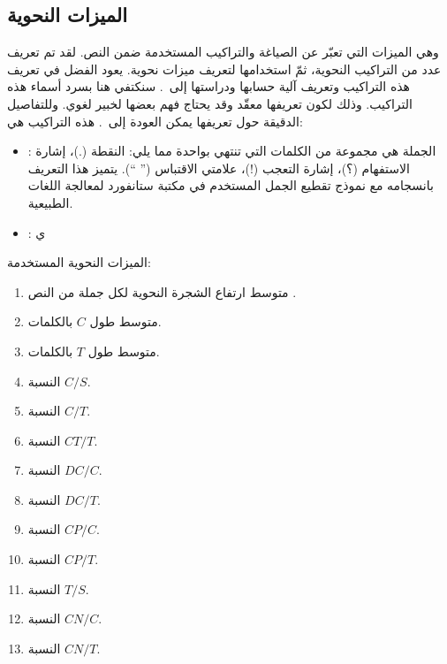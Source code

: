 \subsection{الميزات النحوية }
وهي الميزات التي تعبّر عن الصياغة والتراكيب المستخدمة ضمن النص.
لقد تم تعريف عدد من التراكيب النحوية، ثمّ استخدامها لتعريف ميزات نحوية.
يعود الفضل في تعريف هذه التراكيب وتعريف آلية حسابها ودراستها إلى~\cite{lu2010}.
سنكتفي هنا بسرد أسماء هذه التراكيب.
وذلك لكون تعريفها معقّد وقد يحتاج فهم بعضها لخبير لغوي.
وللتفاصيل الدقيقة حول تعريفها يمكن العودة إلى~\cite{lu2010}.
هذه التراكيب هي: 
\begin{itemize}
	\item 
	:
	الجملة هي مجموعة من الكلمات التي تنتهي بواحدة مما يلي:
	النقطة (.)، إشارة الاستفهام (؟)، إشارة التعجب (!)، علامتي الاقتباس ('' ``).
	يتميز هذا التعريف بانسجامه مع نموذج تقطيع الجمل المستخدم في مكتبة ستانفورد لمعالجة اللغات الطبيعية.
	\item 
	:
	ي
\end{itemize}

الميزات النحوية المستخدمة:
\begin{enumerate}[resume]
	\item
	متوسط ارتفاع الشجرة النحوية لكل جملة من النص .
	\item 
	متوسط طول $C$ بالكلمات.
	\item 
	متوسط طول $T$ بالكلمات.
	\item 
	النسبة $C/S$.
	\item 
	النسبة $C/T$.
	\item 
	النسبة $CT/T$.
	\item 
	النسبة $DC/C$.
	\item 
	النسبة $DC/T$.
	\item 
	النسبة $CP/C$.
	\item 
	النسبة $CP/T$.
	\item 
	النسبة $T/S$.
	\item 
	النسبة $CN/C$.
	\item 
	النسبة $CN/T$.
\end{enumerate}



